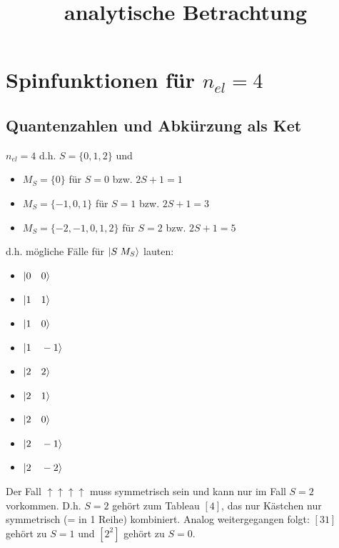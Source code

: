 \documentclass[12pt,a4paper]{article}
\begin{document}
\title{analytische Betrachtung}

\tableofcontents
\newpage


\section{Spinfunktionen für $n_{el} = 4$}

\subsection{Quantenzahlen und Abkürzung als Ket}
 $n_{el} = 4$ d.h. $S = \{ 0, 1, 2\}$ und 
\begin{itemize}
\item $M_S = \{0\}$ für $S = 0$ bzw. $2S+1 = 1$
\item $M_S = \{-1, 0, 1\}$ für $S = 1$ bzw. $2S+1 = 3$
\item $M_S = \{-2, -1, 0, 1, 2\}$ für $S = 2$ bzw. $2S+1=5$
\end{itemize}


d.h. mögliche Fälle für $\ket{ S \; M_S }$ lauten: 
\begin{itemize}
\item $\ket{ 0\quad 0}$
\item $\ket{ 1 \quad 1}$
\item $\ket{ 1 \quad 0}$
\item $\ket{ 1 \quad -1}$
\item $\ket{ 2 \quad 2}$
\item $\ket{ 2 \quad 1}$
\item $\ket{ 2 \quad 0}$
\item $\ket{ 2 \quad -1}$
\item $\ket{ 2 \quad -2}$
\end{itemize}



Der Fall $\uparrow\uparrow\uparrow\uparrow$ muss symmetrisch sein und kann nur im Fall $S = 2$ vorkommen. D.h. $S=2$ gehört zum Tableau $\left[ 4\right]$, das nur Kästchen nur symmetrisch (= in 1 Reihe) kombiniert. Analog weitergegangen folgt: $\left[ 31\right]$ gehört zu $S = 1$ und $\left[ 2 ^2 \right]$ gehört zu $S = 0$. 
\end{document}
